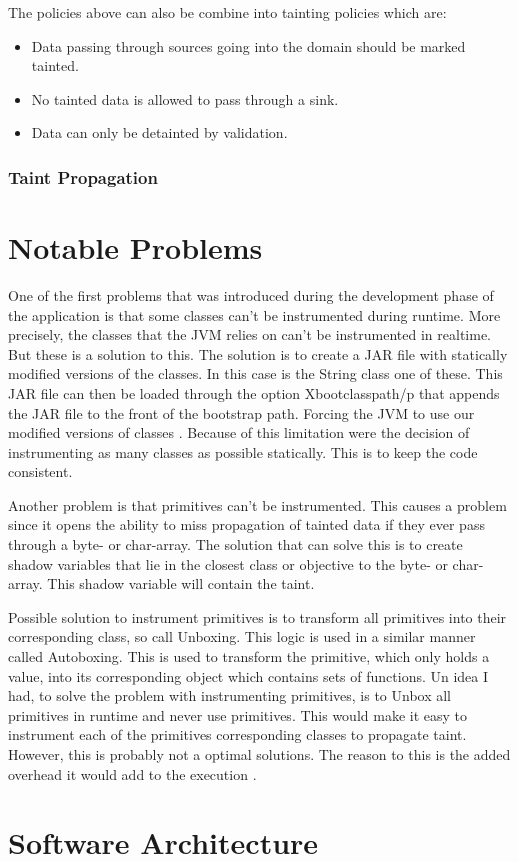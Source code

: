 The policies above can also be combine into tainting policies which are:

\hfill
\begin{itemize}
	\item Data passing through sources going into the domain should be marked tainted.
	\item No tainted data is allowed to pass through a sink.
	\item Data can only be detainted by validation.
\end{itemize}
\hfill


\subsubsection{Taint Propagation}



\section{Notable Problems}
\label{NotableProblems}
One of the first problems that was introduced during the development phase of the application is that some classes can't be instrumented during runtime. More precisely, the classes that the JVM relies on can't be instrumented in realtime. But these is a solution to this. The solution is to create a JAR file with statically modified versions of the classes. In this case is the String class one of these. This JAR file can then be loaded through the option Xbootclasspath/p that appends the JAR file to the front of the bootstrap path. Forcing the JVM to use our modified versions of classes \parencite{xboot}. Because of this limitation were the decision of instrumenting as many classes as possible statically. This is to keep the code consistent.

Another problem is that primitives can't be instrumented. This causes a problem since it opens the ability to miss propagation of tainted data if they ever pass through a byte- or char-array. The solution that can solve this is to create shadow variables that lie in the closest class or objective to the byte- or char-array. This shadow variable will contain the taint.

Possible solution to instrument primitives is to transform all primitives into their corresponding class, so call Unboxing. This logic is used in a similar manner called Autoboxing. This is used to transform the primitive, which only holds a value, into its corresponding object which contains sets of functions. Un idea I had, to solve the problem with instrumenting primitives, is to Unbox all primitives in runtime and never use primitives. This would make it easy to instrument each of the primitives corresponding classes to propagate taint. However, this is probably not a optimal solutions. The reason to this is the added overhead it would add to the execution \parencite{BlochJoshua2008EJ}. 

\section{Software Architecture}
\label{SoftwareArchitecture}

